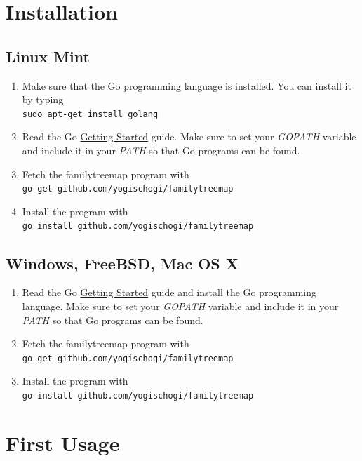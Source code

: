 \documentclass[12pt,a4paper]{article}
\begin{document}
\section{Installation}

\subsection{Linux Mint}
\begin{enumerate}
\item Make sure that the Go programming language is installed.
	You can install it by typing\\
	\texttt{sudo apt-get install golang}
\item Read the Go
	\href{http://golang.org/doc/install}{Getting Started}
	guide. Make sure to set your \emph{GOPATH} variable and
	include it in your \emph{PATH} so that Go programs can be
	found.
\item Fetch the familytreemap program with\\
	\texttt{go get github.com/yogischogi/familytreemap}
\item Install the program with\\
	 \texttt{go install github.com/yogischogi/familytreemap}
\end{enumerate}

\subsection{Windows, FreeBSD, Mac OS X}
\begin{enumerate}
\item Read the Go
	\href{http://golang.org/doc/install}{Getting Started}
	guide and install the Go programming language. 
	Make sure to set your \emph{GOPATH} variable and
	include it in your \emph{PATH} so that Go programs can be
	found.
\item Fetch the familytreemap program with\\
	\texttt{go get github.com/yogischogi/familytreemap}
\item Install the program with\\
	 \texttt{go install github.com/yogischogi/familytreemap}
\end{enumerate}


\section{First Usage}
\end{document}
